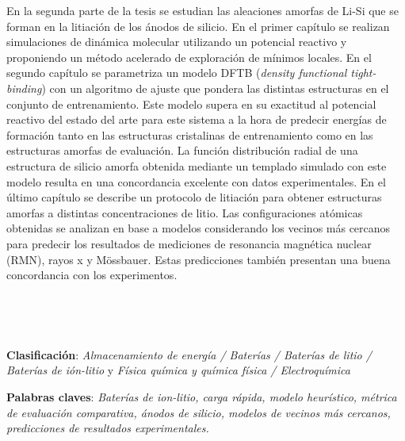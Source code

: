 En la segunda parte de la tesis se estudian las aleaciones amorfas de Li-Si que 
se forman en la litiación de los ánodos de silicio. En el primer capítulo se 
realizan simulaciones de dinámica molecular utilizando un potencial reactivo y 
proponiendo un método acelerado de exploración de mínimos locales. En el segundo 
capítulo se parametriza un modelo DFTB (\textit{density functional tight-binding})
con un algoritmo de ajuste que pondera las distintas estructuras en el conjunto 
de entrenamiento. Este modelo supera en su exactitud al potencial reactivo del 
estado del arte para este sistema a la hora de predecir energías de formación 
tanto en las estructuras cristalinas de entrenamiento como en las estructuras 
amorfas de evaluación. La función distribución radial de una estructura de 
silicio amorfa obtenida mediante un templado simulado con este modelo resulta en 
una concordancia excelente con datos experimentales. En el último capítulo se 
describe un protocolo de litiación para obtener estructuras amorfas a distintas 
concentraciones de litio. Las configuraciones atómicas obtenidas se analizan en base a 
modelos considerando los vecinos más cercanos para predecir los resultados de mediciones de resonancia magnética nuclear (RMN), 
rayos x y Mössbauer. Estas predicciones también presentan una buena concordancia 
con los experimentos.

\

\

\textbf{Clasificación}: \textit{Almacenamiento de energía / Baterías / Baterías de litio / Baterías de ión-litio} y \textit{Física química y química física / Electroquímica}

\textbf{Palabras claves}: \textit{Baterías de ion-litio, carga rápida, modelo heurístico, métrica de evaluación comparativa, ánodos de silicio, modelos de vecinos más cercanos, predicciones de resultados experimentales.}
